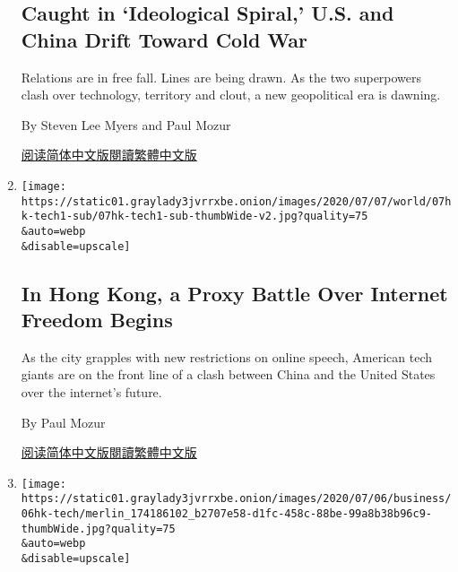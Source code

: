 \begin{enumerate}
  \hypertarget{caught-in-ideological-spiral-us-and-china-drift-toward-cold-war}{%
  \subsection{Caught in `Ideological Spiral,' U.S. and China Drift
  Toward Cold
  War}\label{caught-in-ideological-spiral-us-and-china-drift-toward-cold-war}}

  Relations are in free fall. Lines are being drawn. As the two
  superpowers clash over technology, territory and clout, a new
  geopolitical era is dawning.

  By Steven Lee Myers and Paul Mozur

  \href{https://cn.nytimes3xbfgragh.onion/asia-pacific/20200715/cold-war-china-us/}{阅读简体中文版}\href{https://cn.nytimes3xbfgragh.onion/asia-pacific/20200715/cold-war-china-us/zh-hant/}{閱讀繁體中文版}
\item
  \href{/2020/07/07/business/hong-kong-security-law-tech.html}{}

  \texttt{[image: https://static01.graylady3jvrrxbe.onion/images/2020/07/07/world/07hk-tech1-sub/07hk-tech1-sub-thumbWide-v2.jpg?quality=75\\\&auto=webp\\\&disable=upscale]}

  \hypertarget{in-hong-kong-a-proxy-battle-over-internet-freedom-begins}{%
  \subsection{In Hong Kong, a Proxy Battle Over Internet Freedom
  Begins}\label{in-hong-kong-a-proxy-battle-over-internet-freedom-begins}}

  As the city grapples with new restrictions on online speech, American
  tech giants are on the front line of a clash between China and the
  United States over the internet's future.

  By Paul Mozur

  \href{https://cn.nytimes3xbfgragh.onion/business/20200708/hong-kong-security-law-tech/}{阅读简体中文版}\href{https://cn.nytimes3xbfgragh.onion/business/20200708/hong-kong-security-law-tech/zh-hant/}{閱讀繁體中文版}
\item
  \href{/2020/07/06/technology/tiktok-google-facebook-twitter-hong-kong.html}{}

  \texttt{[image: https://static01.graylady3jvrrxbe.onion/images/2020/07/06/business/06hk-tech/merlin\_174186102\_b2707e58-d1fc-458c-88be-99a8b38b96c9-thumbWide.jpg?quality=75\\\&auto=webp\\\&disable=upscale]}


\end{enumerate}
